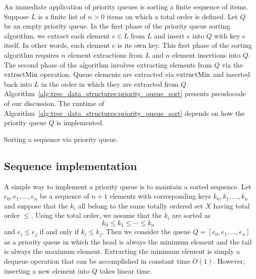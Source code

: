 An immediate application of priority queues is sorting a finite
sequence of items. Suppose $L$ is a finite list of $n > 0$ items on
which a total order is defined. Let $Q$ be an empty priority queue. In
the first phase of the priority queue sorting algorithm, we extract
each element $e \in L$ from $L$ and insert $e$ into $Q$ with key $e$
itself. In other words, each element $e$ is its own key. This first
phase of the sorting algorithm requires $n$ element extractions from
$L$ and $n$ element insertions into $Q$. The second phase of the
algorithm involves extracting elements from $Q$ via the $\operatorname*{extractMin}$
operation. Queue elements are extracted via $\operatorname*{extractMin}$ and inserted
back into $L$ in the order in which they are extracted from
$Q$. Algorithm~\ref{alg:tree_data_structures:priority_queue_sort}
presents pseudocode of our discussion. The runtime of
Algorithm~\ref{alg:tree_data_structures:priority_queue_sort} depends
on how the priority queue $Q$ is implemented.

\begin{algorithm}[!htbp]

\caption{Sorting a sequence via priority queue.}
\label{alg:tree_data_structures:priority_queue_sort}
\end{algorithm}



\subsection{Sequence implementation}

A simple way to implement a priority queue is to maintain a sorted
sequence. Let $e_0, e_1, \dots, e_n$ be a sequence of $n + 1$ elements
with corresponding keys $k_0, k_1, \dots, k_n$ and suppose that the
$k_i$ all belong to the same totally ordered set $X$ having total
order $\leq$. Using the total order, we assume that the $k_i$ are
sorted as
\[
k_0 \leq k_1 \leq \cdots \leq k_n
\]
and $e_i \leq e_j$ if and only if $k_i \leq k_j$. Then we consider the
queue $Q = [e_0, e_1, \dots, e_n]$ as a priority queue in which the
head is always the minimum element and the tail is always the maximum
element. Extracting the minimum element is simply a dequeue operation
that can be accomplished in constant time $O(1)$. However, inserting a
new element into $Q$ takes linear time.

